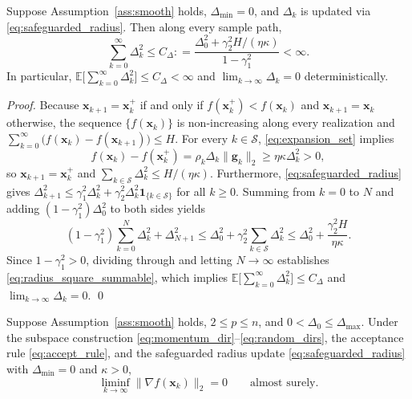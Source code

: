 \documentclass[smallextended]{svjour3}
\newcommand{\bx}{\bm{x}}
\newcommand{\bg}{\bm{g}}
\providecommand{\coloneqq}{\mathrel{\mathop:}=}
\begin{document}
\begin{lemma}
\label{lem:radius_summability}
\label{lem:radius_decay}
Suppose Assumption~\ref{ass:smooth} holds, $\Delta_{\min}=0$, and $\Delta_k$ is updated via \eqref{eq:safeguarded_radius}. Then along every sample path,
\begin{equation}
\label{eq:radius_square_summable}
\sum_{k=0}^{\infty}\Delta_k^2 \le C_\Delta \coloneqq \frac{\Delta_0^2 + \gamma_2^2 H / (\eta\kappa)}{1 - \gamma_1^2} < \infty.
\end{equation}
In particular, $\mathbb E\bigl[\sum_{k=0}^{\infty}\Delta_k^2\bigr] \le C_\Delta < \infty$ and $\lim_{k\to\infty} \Delta_k = 0$ deterministically.
\end{lemma}

\begin{proof}
Because $\bx_{k+1} = \bx_k^+$ if and only if $f(\bx_k^+) < f(\bx_k)$ and $\bx_{k+1} = \bx_k$ otherwise, the sequence $\{f(\bx_k)\}$ is non-increasing along every realization and $\sum_{k=0}^{\infty}\bigl(f(\bx_k)-f(\bx_{k+1})\bigr) \le H$. For every $k \in \mathcal S$, \eqref{eq:expansion_set} implies
\[
f(\bx_k)-f(\bx_k^+) = \rho_k\Delta_k\|\bg_k\|_2 \ge \eta\kappa\Delta_k^2 > 0,
\]
so $\bx_{k+1} = \bx_k^+$ and $\sum_{k\in\mathcal S}\Delta_k^2 \le H/(\eta\kappa)$. Furthermore, \eqref{eq:safeguarded_radius} gives $\Delta_{k+1}^2 \le \gamma_1^2\Delta_k^2 + \gamma_2^2\Delta_k^2\mathbf{1}_{\{k\in\mathcal S\}}$ for all $k\ge 0$. Summing from $k=0$ to $N$ and adding $(1-\gamma_1^2)\Delta_0^2$ to both sides yields
\[
(1-\gamma_1^2) \sum_{k=0}^{N}\Delta_k^2 + \Delta_{N+1}^2 \le \Delta_0^2 + \gamma_2^2 \sum_{k\in\mathcal S}\Delta_k^2 \le \Delta_0^2 + \frac{\gamma_2^2 H}{\eta\kappa}.
\]
Since $1-\gamma_1^2 > 0$, dividing through and letting $N\to\infty$ establishes \eqref{eq:radius_square_summable}, which implies $\mathbb E\bigl[\sum_{k=0}^{\infty}\Delta_k^2\bigr] \le C_\Delta$ and $\lim_{k\to\infty}\Delta_k = 0$.
\qed
\end{proof}

\begin{theorem}
\label{thm:liminf_convergence}
Suppose Assumption~\ref{ass:smooth} holds, $2 \le p \le n$, and $0 < \Delta_0 \le \Delta_{\max}$. Under the subspace construction \eqref{eq:momentum_dir}--\eqref{eq:random_dirs}, the acceptance rule \eqref{eq:accept_rule}, and the safeguarded radius update \eqref{eq:safeguarded_radius} with $\Delta_{\min}=0$ and $\kappa > 0$,
\begin{equation}
\label{eq:liminf_gradient}
\liminf_{k\to\infty} \|\nabla f(\bx_k)\|_2 = 0 \qquad \text{almost surely}.
\end{equation}
\end{theorem}
\end{document}
